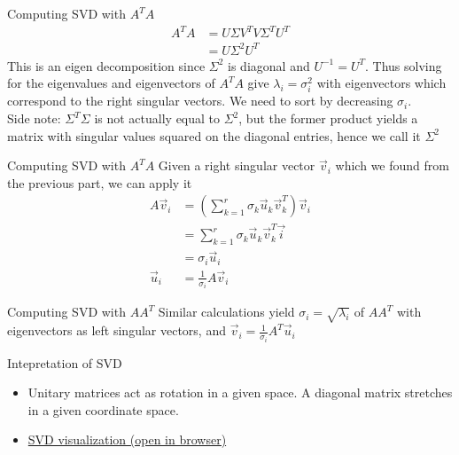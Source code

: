 \documentclass{beamer}
\begin{document}
    \begin{frame}{Computing SVD with $A^T A$}
		\begin{align*}
			A^T A &= U \Sigma V^T V \Sigma^T U^T \\
			&= U \Sigma^2 U^T
		\end{align*}
		This is an eigen decomposition since $\Sigma^2$ is diagonal and $U^{-1} = U^T$. Thus solving for the eigenvalues and eigenvectors of $A^T A$ give $\lambda_i = \sigma_i^2$ with eigenvectors which correspond to the right singular vectors. We need to sort by decreasing $\sigma_i$. \\

        \alert{Side note:} $\Sigma^T \Sigma$ is not actually equal to $\Sigma^2$, but the former product yields a matrix with singular values squared on the diagonal entries, hence we call it $\Sigma^2$
    \end{frame}

    \begin{frame}{Computing SVD with $A^T A$}
Given a right singular vector $\vec{v}_i$ which we found from the previous part, we can apply it
		\begin{align*}
			A \vec{v}_i &= \left( \sum_{k = 1}^r \sigma_k \vec{u}_k \vec{v}_k^T \right) \vec{v}_i \\
			&= \sum_{k = 1}^r \sigma_k \vec{u}_k \vec{v}_k^T \vec{i} \\
			&= \sigma_i \vec{u}_i \\
			\vec{u}_i &= \frac{1}{\sigma_i} A \vec{v}_i
		\end{align*}
    \end{frame}

    \begin{frame}{Computing SVD with $A A^T$}
        Similar calculations yield $\sigma_i = \sqrt{\lambda_i}$ of $A A^T$ with eigenvectors as left singular vectors, and $\vec{v}_i = \frac{1}{\sigma_i} A^T \vec{u}_i$
    \end{frame}

    \begin{frame}{Intepretation of SVD}
    \begin{itemize}
    	\item Unitary matrices act as rotation in a given space. A diagonal matrix stretches in a given coordinate space.
    	
    	\item \href{https://en.wikipedia.org/wiki/File:Singular_value_decomposition.gif}{SVD visualization (open in browser)}
    \end{itemize}
		

		

    \end{frame}
\end{document}
